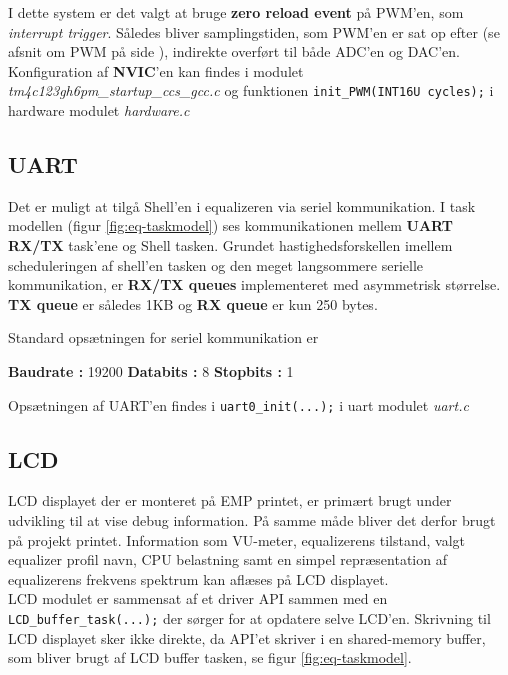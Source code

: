 I dette system er det valgt at bruge \textbf{zero reload event} på PWM'en, som \textit{interrupt trigger}.
Således bliver samplingstiden, som PWM'en er sat op efter (se afsnit om PWM på side \pageref{subsec:pwm}), indirekte overført til både ADC'en og DAC'en.\\ 

Konfiguration af \textbf{NVIC}'en kan findes i modulet \textit{tm4c123gh6pm\_startup\_ccs\_gcc.c} og funktionen \texttt{init\_PWM(INT16U cycles);} i hardware modulet \textit{hardware.c}

\subsection{UART}\label{subsec:uart}
Det er muligt at tilgå Shell'en i equalizeren via seriel kommunikation.
I task modellen (figur \ref{fig:eq-taskmodel}) ses kommunikationen mellem \textbf{UART RX/TX} task'ene og Shell tasken.
Grundet hastighedsforskellen imellem scheduleringen af shell'en tasken og den meget langsommere serielle kommunikation, er \textbf{RX/TX queues} implementeret med asymmetrisk størrelse. 	
\textbf{TX queue} er således 1KB og \textbf{RX queue} er kun  250 bytes.

Standard opsætningen for seriel kommunikation er
\begin{center}
	\textbf{Baudrate : }19200  \quad \textbf{Databits : } 8 \quad \textbf{Stopbits : }1
\end{center}

Opsætningen af UART'en findes i \texttt{uart0\_init(...);} i uart modulet \textit{uart.c}

\subsection{LCD}
LCD displayet der er monteret på EMP printet, er primært brugt under udvikling til at vise debug information. På samme måde bliver det derfor  brugt på projekt printet.
Information som VU-meter, equalizerens tilstand, valgt equalizer profil navn, CPU belastning samt en simpel repræsentation af equalizerens frekvens spektrum kan aflæses på LCD displayet.\\

LCD modulet er sammensat af et driver API sammen med en \texttt{LCD\_buffer\_task(...);} der sørger for at opdatere selve LCD'en.
Skrivning til LCD displayet sker ikke direkte, da API'et skriver i en shared-memory buffer, som bliver brugt af LCD buffer tasken, se figur \ref{fig:eq-taskmodel}.\\
 
